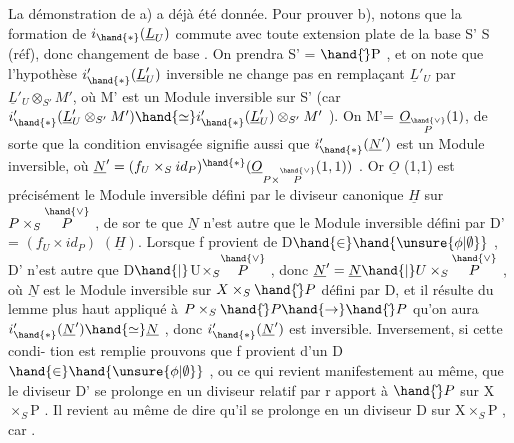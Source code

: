 La démonstration de a) a déjà été donnée. Pour prouver b), notons
que la formation de $i_{\hand{*}}(\underline{L}_U)$ commute avec toute extension plate de la
base S' \quad S (réf), donc  
 changement de base . On
prendra S' = $\hand{\check{}}\mathrm{P}$ , et on note que l'hypothèse $i'_{\hand{*}}(\underline{L}'_U)$ inversible ne
change pas en remplaçant $\underline{L}'_U$ par $\underline{L}'_U\otimes_{S'}M'$, où M' est un Module inversible
sur S' (car $i'_{\hand{*}}(\underline{L}'_U\otimes_{S'}M')\hand{\simeq} i'_{\hand{*}}(\underline{L}'_U)\otimes_{S'}M'$ ). On  M'= $\underline{O}_{\overset{\hand{\vee}}{P}}(1)$, de
sorte que la condition envisagée signifie aussi que $i'_{\hand{*}}(\underline{N}')$ est un Module
inversible, où $\underline{N}'= (f_U\times_S id_P)^{\hand{*}}(\underline{O}_{P\times\overset{\hand{\vee}}{P}}(1,1))$ . Or $\underline{O}$ (1,1) est précisément
le Module inversible défini par le diviseur canonique $\underline{H}$ sur $P\times_S\overset{\hand{\vee}}{P}$ , de sor%
te que $\underline{N}$ n'est autre que le Module inversible défini par \qquad D' =
$(f_U\times id_P)$ $(\underline{H})$.  Lorsque f provient de D$\hand{\in}\hand{\unsure{\phi|\emptyset}}$ , 
D' n'est autre que D$\hand{|}$U$\times_S\overset{\hand{\vee}}{P}$ ,  donc $\underline{N}' = \underline{N}\hand{|}U\times_S\overset{\hand{\vee}}{P}$ ,
où $\underline{N}$ est le Module inversible sur $X\times_S\hand{\check{}}P$ défini par D, et il résulte
du lemme  plus haut  appliqué à $P\times_S\hand{\check{}}P\hand{\to}\hand{\check{}}P$ qu'on aura
$i'_{\hand{*}}(\underline{N}')\hand{\simeq}\underline{N}$ , donc $i'_{\hand{*}}(\underline{N}')$ est inversible. Inversement, si cette condi-%
tion est remplie prouvons que f provient d'un D$\hand{\in}\hand{\unsure{\phi|\emptyset}}$ , ou ce qui revient
manifestement au même, que le diviseur D' se prolonge en un diviseur 
 relatif par r apport  à $\hand{\check{}}P$ sur X$\times_S$P . Il  revient au même
de dire qu'il se prolonge en un diviseur  D sur X$\times_S$P , car .


